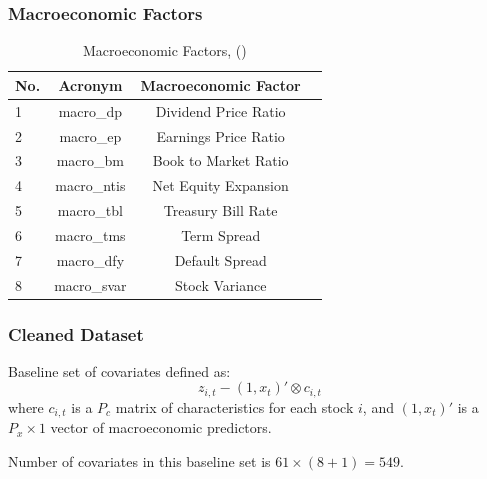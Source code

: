\documentclass[aspectratio=169]{beamer}
\begin{document}
\begin{frame}
\frametitle{Macroeconomic Factors}
\begin{table}
	\caption{Macroeconomic Factors, (\cite{welch_comprehensive_2008})}
	\begin{center}
		\begin{tabular}{lccc} \hline
			No. & Acronym & Macroeconomic Factor \\ \hline
			1 & macro\_dp & Dividend Price Ratio \\
			2 & macro\_ep & Earnings Price Ratio \\
			3 & macro\_bm & Book to Market Ratio \\
			4 & macro\_ntis & Net Equity Expansion \\
			5 & macro\_tbl & Treasury Bill Rate \\
			6 & macro\_tms & Term Spread \\
			7 & macro\_dfy & Default Spread \\
			8 & macro\_svar & Stock Variance \\ \hline
		\end{tabular}
	\end{center}
\end{table}
\end{frame}

\begin{frame}
\frametitle{Cleaned Dataset}
Baseline set of covariates defined as:
\begin{equation}
	z_{i,t} - (1, x_t)' \otimes c_{i,t}
\end{equation}
where $c_{i,t}$ is a $P_c$ matrix of characteristics for each stock $i$, and $(1, x_t)'$ is a $P_x \times 1$ vector of macroeconomic predictors.

Number of covariates in this baseline set is $61 \times (8 + 1) = 549$. 
\end{frame}

\end{document}
